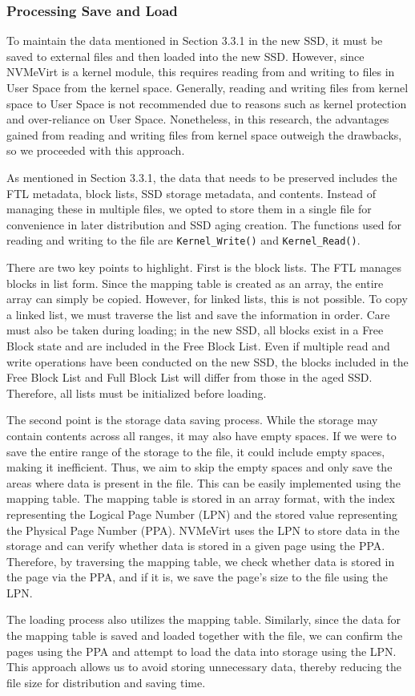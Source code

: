 \subsubsection{Processing Save and Load}

To maintain the data mentioned in Section 3.3.1 in the new SSD, it must be saved to external files and then loaded into the new SSD.
However, since NVMeVirt is a kernel module, this requires reading from and writing to files in User Space from the kernel space.
Generally, reading and writing files from kernel space to User Space is not recommended due to reasons such as kernel protection and over-reliance on User Space.
Nonetheless, in this research, the advantages gained from reading and writing files from kernel space outweigh the drawbacks, so we proceeded with this approach.


As mentioned in Section 3.3.1, the data that needs to be preserved includes the FTL metadata, block lists, SSD storage metadata, and contents.
Instead of managing these in multiple files, we opted to store them in a single file for convenience in later distribution and SSD aging creation.
The functions used for reading and writing to the file are \texttt{Kernel\_Write()} and \texttt{Kernel\_Read()}.

There are two key points to highlight.
First is the block lists.
The FTL manages blocks in list form.
Since the mapping table is created as an array, the entire array can simply be copied.
However, for linked lists, this is not possible.
To copy a linked list, we must traverse the list and save the information in order.
Care must also be taken during loading; in the new SSD, all blocks exist in a Free Block state and are included in the Free Block List.
Even if multiple read and write operations have been conducted on the new SSD, the blocks included in the Free Block List and Full Block List will differ from those in the aged SSD.
Therefore, all lists must be initialized before loading.

The second point is the storage data saving process.
While the storage may contain contents across all ranges, it may also have empty spaces.
If we were to save the entire range of the storage to the file, it could include empty spaces, making it inefficient.
Thus, we aim to skip the empty spaces and only save the areas where data is present in the file.
This can be easily implemented using the mapping table.
The mapping table is stored in an array format, with the index representing the Logical Page Number (LPN) and the stored value representing the Physical Page Number (PPA).
NVMeVirt uses the LPN to store data in the storage and can verify whether data is stored in a given page using the PPA.
Therefore, by traversing the mapping table, we check whether data is stored in the page via the PPA, and if it is, we save the page's size to the file using the LPN.


The loading process also utilizes the mapping table.
Similarly, since the data for the mapping table is saved and loaded together with the file, we can confirm the pages using the PPA and attempt to load the data into storage using the LPN.
This approach allows us to avoid storing unnecessary data, thereby reducing the file size for distribution and saving time.
